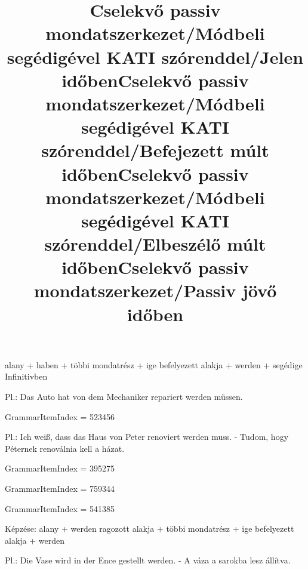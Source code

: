 \begin{desc}
alany + haben + többi mondatrész + ige befelyezett alakja + werden + segédige Infinitivben

Pl.: Das Auto hat von dem Mechaniker repariert werden müssen.
\end{desc}

\begin{exmp}
\end{exmp}

\title{Cselekvő passiv mondatszerkezet/Módbeli segédigével KATI szórenddel/Jelen időben}

GrammarItemIndex = 523456

\begin{desc}
Pl.: Ich weiß, dass das Haus von Peter renoviert werden muss. - Tudom, hogy Péternek renoválnia kell a házat.
\end{desc}

\begin{exmp}
\end{exmp}

\title{Cselekvő passiv mondatszerkezet/Módbeli segédigével KATI szórenddel/Befejezett múlt időben}

GrammarItemIndex = 395275

\begin{desc}
\end{desc}

\begin{exmp}
\end{exmp}

\title{Cselekvő passiv mondatszerkezet/Módbeli segédigével KATI szórenddel/Elbeszélő múlt időben}

GrammarItemIndex = 759344

\begin{desc}
\end{desc}

\begin{exmp}
\end{exmp}

\title{Cselekvő passiv mondatszerkezet/Passiv jövő időben}

GrammarItemIndex = 541385

\begin{desc}
Képzése:
alany + werden ragozott alakja + többi mondatrész + ige befelyezett alakja + werden

Pl.: Die Vase wird in der Ence gestellt werden. - A váza a sarokba lesz állítva.
\end{desc}


